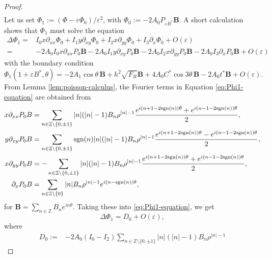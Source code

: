 \documentclass[10pt,a4paper]{amsart}
\begin{document}
\begin{proof}
\begin{align*}
\end{align*} 
Let us set  $ \Phi_1:=(\Phi-\varepsilon\Phi_0)/ \varepsilon^2 $, with $ \Phi_0:=-2A_0P_{\varepsilon B^*} \textbf{B}. $ A short calculation shows that $\Phi_1$ must solve the equation
 \begin{equation}\label{eq:Phi1-equation}
 \begin{split}
 \Delta\Phi_1=&I_0x\partial_{xx}\Phi_0+I_1y\partial_{xy}\Phi_0+I_2x\partial_{yy}\Phi_0+I_3\partial_x\Phi_0+O(\varepsilon)\\
=&-2A_0I_0x\partial_{xx}P_0\textbf{B}-2A_0I_1y\partial_{xy}P_0\textbf{B}-2A_0I_2x\partial_{yy}P_0\textbf{B}-2A_0I_3\partial_xP_0\textbf{B}+O(\varepsilon) 
 \end{split}
 \end{equation}
with the boundary condition  
 \begin{equation*} 
 \Phi_1(1+\varepsilon B^*,\theta)
 =-2A_1 \cos\theta\, \textbf{B}+h^2\sqrt{F_R} \textbf{B}+4 A_0C^*\cos3\theta\, \textbf{B}-2 A_0 t^*\textbf{B}+O(\varepsilon).
 \end{equation*}
From Lemma \ref{lem:poisson-calculus}, the Fourier   terms in  Equation \eqref{eq:Phi1-equation} are obtained from
 \begin{align*} 
 x\partial_{xx}P_0\textbf{B}
 &=\sum_{n\in\mathbb{Z}\setminus\{0,\pm1\}}|n|(|n|-1)B_n\rho^{|n|-1}
 \frac{e^{i(n+1-2\text{sgn}(n))\theta}+e^{i(n-1-2\text{sgn}(n))\theta}}{2},
\notag\\
 y\partial_{xy}P_0\textbf{B}
 &=\sum_{n\in\mathbb{Z}\setminus\{0,\pm1\}}\text{sgn}(n)|n|(|n|-1)B_n\rho^{|n|-1}
 \frac{e^{i(n+1-2\text{sgn}(n))\theta}-e^{i(n-1-2\text{sgn}(n))\theta}}{2},
\notag\\
 x\partial_{yy}P_0\textbf{B}
 &=-\sum_{n\in\mathbb{Z}\setminus\{0,\pm1\}}|n|(|n|-1)B_n\rho^{|n|-1}
 \frac{e^{i(n+1-2\text{sgn}(n))\theta}+e^{i(n-1-2\text{sgn}(n))\theta}}{2},
\notag\\
 \partial_xP_0\textbf{B}
 &=\sum_{n\in\mathbb{Z}\setminus\{0\}}|n|B_n\rho^{|n|-1}e^{i(n-\text{sgn}(n))\theta},
\notag
 \end{align*}
for $ \textbf{B}=\sum_{n\in\mathbb Z}B_ne^{in\theta} $.  Taking these into \eqref{eq:Phi1-equation}, we get
\begin{equation*} 
 \Delta\Phi_1=D_0+O(\varepsilon), 
\end{equation*}
where 
\begin{equation*} 
\begin{split}
D_0:=&-2A_0(I_0-I_2)\sum_{n\in\mathbb{Z}\setminus\{0,\pm1\}}|n|(|n|-1)B_n\rho^{|n|-1}

\end{split}
\end{equation*}
\end{proof}
\end{document}
